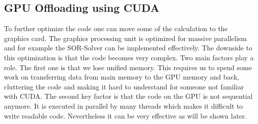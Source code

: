 \documentclass[master.tex]{subfiles}
\begin{document}
\subsection{GPU Offloading using CUDA}
To further optimize the code one can move some of the calculation to the graphics card. The graphics processing unit is optimized for massive parallelism and for example the SOR-Solver can be implemented effectively. The downside to this optimization is that the code becomes very complex. Two main factors play a role. The first one is that we lose unified memory. This requires us to spend some work on transferring data from main memory to the GPU memory and back, cluttering the code and making it hard to understand for someone not familiar with CUDA. The second key factor is that the code on the GPU is not sequential anymore. It is executed in parallel by many threads which makes it difficult to write readable code.\newline
Nevertheless it can be very effective as will be shown later.
\end{document}
